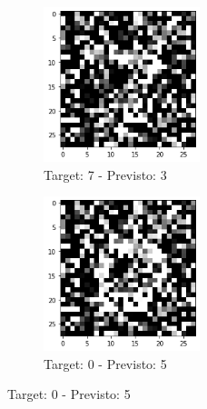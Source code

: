 \documentclass[12pt, a4paper]{article}
\begin{document}
\begin{figure}[H]
    \begin{subfigure}{0.5\textwidth}
        \centering
        \caption{Target: 7 - Previsto: 3}
        \includegraphics[width=0.5\textwidth]{ErrClass1.png}
    \end{subfigure}
    \begin{subfigure}{0.5\textwidth}
        \centering
        \caption{Target: 0 - Previsto: 5}
        \includegraphics[width=0.5\textwidth]{ErrClass2.png}
    \end{subfigure}
\end{figure}
\end{document}
